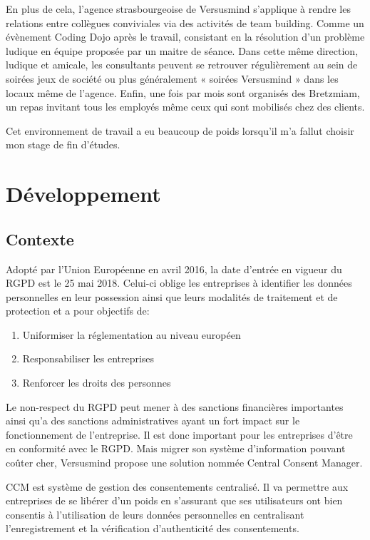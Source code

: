 \documentclass[12pt, a4paper]{report}
\newcommand\tab[1][1cm]{\hspace*{#1}}
\begin{document}
En plus de cela, l’agence strasbourgeoise de Versusmind s’applique à rendre les relations entre
collègues conviviales via des activités de team building. Comme un évènement Coding Dojo après le
travail, consistant en la résolution d’un problème ludique en équipe proposée par un maitre de séance.
Dans cette même direction, ludique et amicale, les consultants peuvent se retrouver régulièrement au
sein de soirées jeux de société ou plus généralement « soirées Versusmind » dans les locaux même de
l’agence. Enfin, une fois par mois sont organisés des Bretzmiam, un repas invitant tous les employés
même ceux qui sont mobilisés chez des clients.\newline

Cet environnement de travail a eu beaucoup de poids lorsqu’il m’a fallut choisir mon stage de fin d'études.
\chapter{Développement}
\section{Contexte}
\tab{} Adopté par l’Union Européenne en avril 2016, la date d’entrée en vigueur du RGPD est le 25 mai 2018. Celui-ci oblige les entreprises à identifier les données personnelles en leur possession ainsi que leurs modalités de traitement et de protection et a pour objectifs de\@:
\begin{enumerate}
    \item Uniformiser la réglementation au niveau européen
    \item Responsabiliser les entreprises
    \item Renforcer les droits des personnes
\end{enumerate}
\tab{} Le non-respect du RGPD peut mener à des sanctions financières importantes ainsi qu'a des sanctions administratives ayant un fort impact sur le fonctionnement de l'entreprise.
Il est donc important pour les entreprises d'être en conformité avec le RGPD.\newline
Mais migrer son système d'information pouvant coûter cher, Versusmind propose une solution nommée Central Consent Manager.

\tab{} CCM est système de gestion des consentements centralisé. Il va permettre aux entreprises de se libérer d'un poids en s'assurant que ses utilisateurs ont bien consentis à l'utilisation de leurs données personnelles en centralisant l'enregistrement et la vérification d'authenticité des consentements.
\end{document}
